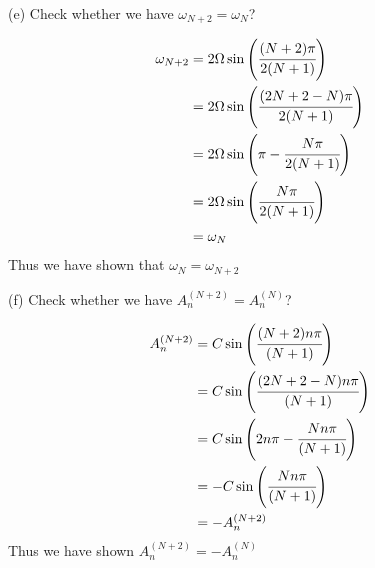 \documentclass[addpoints]{exam}
\begin{document}
\begin{questions}
\begin{solution}
\begin{center}
    \end{center}
\end{solution}
(e) Check whether we have $\omega_{N+2} = \omega_N$?
\begin{solution}
    \begin{align*}
        \omega_{N+2} &= 2\Omega \sin\left(\cfrac{(N+2)\pi}{2(N+1)}\right)\\ 
                     &= 2\Omega \sin\left(\cfrac{(2N+2-N)\pi}{2(N+1)}\right)\\
                     &= 2\Omega \sin\left(\pi - \cfrac{N\pi}{2(N+1)}\right)\\
                     &= 2\Omega \sin\left( \cfrac{N\pi}{2(N+1)}\right)\\
                     & = \omega_N
    \end{align*}
    Thus we have shown that $\omega_N = \omega_{N+2}$
\end{solution}
(f) Check whether we have $A^{(N +2)}_n = A^{(N)}_n$?
\begin{solution}
    \begin{align*}
        A_{n}^{(N+2)} &= C \sin\left(\cfrac{(N+2)n\pi}{(N+1)}\right)\\ 
                     &= C \sin\left(\cfrac{(2N+2-N)n\pi}{(N+1)}\right)\\
                     &= C \sin\left(2n\pi - \cfrac{Nn\pi}{(N+1)}\right)\\
                     &= -C \sin\left(\cfrac{Nn\pi}{(N+1)}\right)\\
                     &= -A_n^{(N+2)}
    \end{align*}
    Thus we have shown $A_n^{(N+2)} = -A_n^{(N)}$


\end{solution}
\end{questions}
\end{document}
